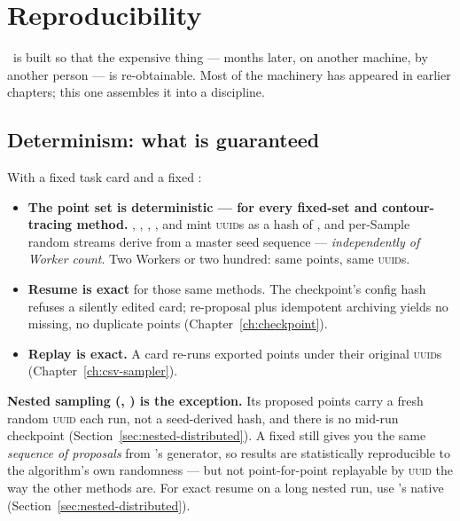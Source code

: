 \chapter{Reproducibility}
\label{ch:reproducibility}

 \Jtwo\ is built so that the
expensive thing --- months later, on another machine, by another person --- is
re-obtainable. Most of the machinery has appeared in earlier chapters; this one
assembles it into a discipline.

\section{Determinism: what is guaranteed}
\label{sec:determinism}

With a fixed task card and a fixed :

\begin{itemize}
  \item \textbf{The point set is deterministic --- for every fixed-set and
        contour-tracing method.} , , ,
        , and  mint \textsc{uuid}s as a hash
        of , and per-Sample random streams derive from a
        master seed sequence --- \emph{independently of Worker count}. Two Workers or
        two hundred: same points, same \textsc{uuid}s.
  \item \textbf{Resume is exact} for those same methods. The checkpoint's config hash
        refuses a silently edited card; re-proposal plus idempotent archiving yields no
        missing, no duplicate points (Chapter~\ref{ch:checkpoint}).
  \item \textbf{Replay is exact.} A  card re-runs exported points under
        their original \textsc{uuid}s (Chapter~\ref{ch:csv-sampler}).
\end{itemize}

\begin{jwarn}
\textbf{Nested sampling (, ) is the exception.}
Its proposed points carry a fresh random \textsc{uuid} each run, not a seed-derived
hash, and there is no mid-run checkpoint (Section~\ref{sec:nested-distributed}). A
fixed  still gives you the same \emph{sequence of proposals} from
's generator, so results are statistically reproducible to the algorithm's
own randomness --- but not point-for-point replayable by \textsc{uuid} the way the
other methods are. For exact resume on a long nested run, use 's native
 (Section~\ref{sec:nested-distributed}).
\end{jwarn}

